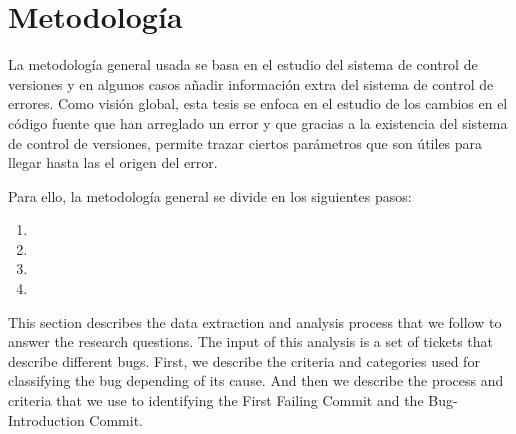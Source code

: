 \documentclass[a4paper, 12pt]{book}
\begin{document}
\section{Metodolog\'ia}
La metodolog\'ia general usada se basa en el estudio del sistema de control de versiones y en algunos casos a\~nadir informaci\'on extra del sistema de control de errores. Como visi\'on global, esta tesis se enfoca en el estudio de los cambios en el c\'odigo fuente que han arreglado un error y que gracias a la existencia del sistema de control de versiones, permite trazar ciertos par\'ametros que son \'utiles para llegar hasta las el origen del error.

Para ello, la metodolog\'ia general se divide en los siguientes pasos:

\begin{enumerate}
  \item{}
  \item{}
  \item{}
  \item{}
\end{enumerate}



This section describes the data extraction and analysis process that we follow to answer the research questions. The input of this analysis is a set of tickets that describe different bugs. First, we describe the criteria and categories used for classifying the bug depending of its cause. And then we describe the process and criteria that we use to identifying the First Failing Commit and the Bug-Introduction Commit.
\end{document}
